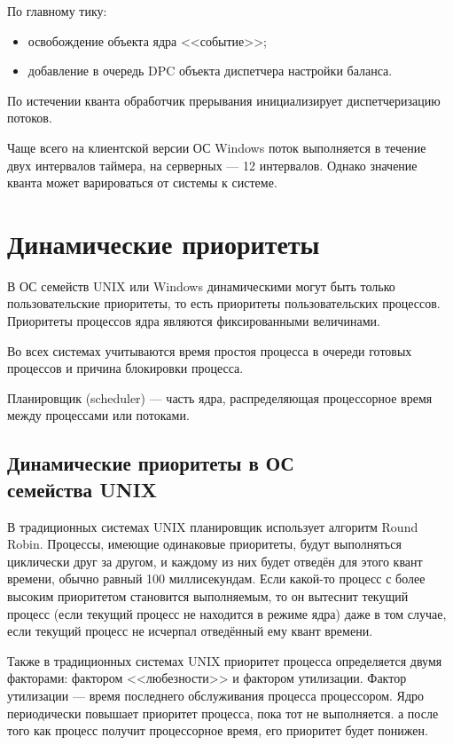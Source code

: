 По главному тику:
\begin{itemize}
	\item освобождение объекта ядра <<событие>>;
	\item добавление в очередь DPC объекта диспетчера настройки баланса.
\end{itemize}

По истечении кванта обработчик прерывания инициализирует диспетчеризацию потоков.

Чаще всего на клиентской версии ОС Windows поток выполняется в течение двух
интервалов таймера, на серверных --- 12 интервалов. Однако значение
кванта может варироваться от системы к системе. 

\chapter{Динамические приоритеты}

В ОС семейств UNIX или Windows динамическими могут быть только пользовательские приоритеты, то есть приоритеты пользовательских процессов.
Приоритеты процессов ядра являются фиксированными величинами.

Во всех системах учитываются время простоя процесса в очереди готовых процессов и причина блокировки процесса.

Планировщик (scheduler) --- часть ядра, распределяющая процессорное время между процессами или потоками.

\section[Динамические приоритеты в ОС семейства UNIX]{Динамические приоритеты в ОС \\семейства UNIX}

В традиционных системах UNIX планировщик использует алгоритм Round Robin.
Процессы, имеющие одинаковые приоритеты, будут выполняться циклически друг за другом, и каждому из них
будет отведён для этого квант времени, обычно равный 100 миллисекундам.
Если какой-то процесс с более высоким приоритетом становится выполняемым, то он вытеснит текущий процесс (если текущий процесс не находится в режиме ядра)
даже в том случае, если текущий процесс не исчерпал отведённый ему квант времени.

Также в традиционных системах UNIX приоритет процесса определяется двумя факторами:
фактором <<любезности>> и фактором утилизации. Фактор утилизации ---
время последнего обслуживания процесса процессором. Ядро периодически
повышает приоритет процесса, пока тот не выполняется. а после того как процесс
получит процессорное время, его приоритет будет понижен.

